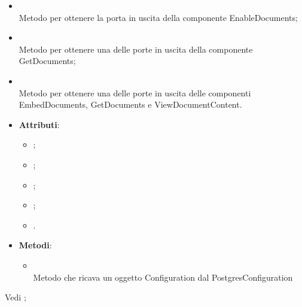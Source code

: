 \documentclass[10pt, a4paper]{article}
\begin{document}
\begin{itemize}
\begin{itemize}
        \item {}\\
        Metodo per ottenere la porta in uscita della componente EnableDocuments;

        \item {}\\ 
        Metodo per ottenere una delle porte in uscita della componente GetDocuments;

        \item {}\\        
        Metodo per ottenere una delle porte in uscita delle componenti EmbedDocuments, GetDocuments e ViewDocumentContent.

        

    \end{itemize}
\end{itemize}


\label{PostgresConfigurationDettaglio}
\begin{itemize}
    \item \textbf{Attributi}:
    \begin{itemize}
        \item {};
        \item {};
        \item {};
        \item {};
        \item {}. 
    \end{itemize}
    \item \textbf{Metodi}:
    \begin{itemize}
        \item {}\\
        Metodo che ricava un oggetto Configuration dal PostgresConfiguration
    \end{itemize}
\end{itemize}

Vedi ;
\end{document}
